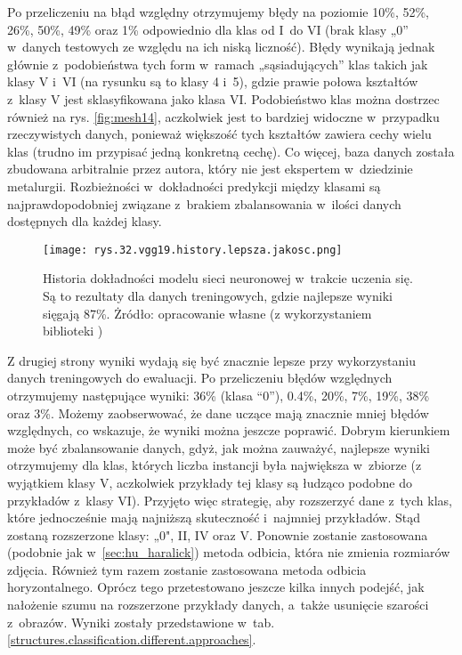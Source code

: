Po przeliczeniu na błąd względny otrzymujemy błędy na poziomie 10\%, 52\%, 26\%, 50\%, 49\% oraz 1\% odpowiednio dla klas od I~do VI (brak klasy „0” w~danych testowych ze względu na ich niską liczność). Błędy wynikają jednak głównie z~podobieństwa tych form w~ramach „sąsiadujących” klas takich jak klasy V i~VI (na rysunku są to klasy 4 i~5), gdzie prawie połowa kształtów z~klasy V jest sklasyfikowana jako klasa VI. Podobieństwo klas można dostrzec również na rys. \ref{fig:mesh14}, aczkolwiek jest to bardziej widoczne w~przypadku rzeczywistych danych, ponieważ większość tych kształtów zawiera cechy wielu klas (trudno im przypisać jedną konkretną cechę). Co więcej, baza danych została zbudowana arbitralnie przez autora, który nie jest ekspertem w~dziedzinie metalurgii. Rozbieżności w~dokładności predykcji między klasami są najprawdopodobniej związane z~brakiem zbalansowania w~ilości danych dostępnych dla każdej klasy.
\begin{figure}[h]
    \centering
    \texttt{[image: rys.32.vgg19.history.lepsza.jakosc.png]}
    \caption{Historia dokładności modelu sieci neuronowej w~trakcie uczenia się. Są to rezultaty dla danych treningowych, gdzie najlepsze wyniki sięgają 87\%. Żródło: opracowanie własne (z wykorzystaniem biblioteki )}
    \label{fig:mesh30}
\end{figure}
Z drugiej strony wyniki wydają się być znacznie lepsze przy wykorzystaniu danych treningowych do ewaluacji. Po przeliczeniu błędów względnych otrzymujemy następujące wyniki: 36\% (klasa “0”), 0.4\%, 20\%, 7\%, 19\%, 38\% oraz 3\%. Możemy zaobserwować, że dane uczące mają znacznie mniej błędów względnych, co wskazuje, że wyniki można jeszcze poprawić. Dobrym kierunkiem może być zbalansowanie danych, gdyż, jak można zauważyć, najlepsze wyniki otrzymujemy dla klas, których liczba instancji była największa w~zbiorze (z wyjątkiem klasy V, aczkolwiek przykłady tej klasy są łudząco podobne do przykładów z~klasy VI). Przyjęto więc strategię, aby rozszerzyć dane z~tych klas, które jednocześnie mają najniższą skuteczność i~najmniej przykładów. Stąd zostaną rozszerzone klasy: „0", II, IV oraz V. Ponownie zostanie zastosowana (podobnie jak w~\ref{sec:hu_haralick}) metoda odbicia, która nie zmienia rozmiarów zdjęcia. Również tym razem zostanie zastosowana metoda odbicia horyzontalnego. Oprócz tego przetestowano jeszcze kilka innych podejść, jak nałożenie szumu na rozszerzone przykłady danych, a~także usunięcie szarości z~obrazów. Wyniki zostały przedstawione w~tab. \ref{structures.classification.different.approaches}. 
